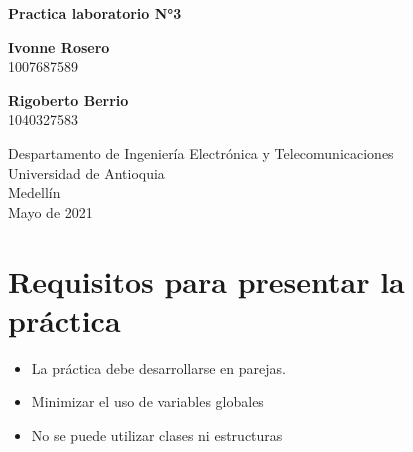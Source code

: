 \documentclass{article}
\begin{document}
\begin{titlepage}
    \begin{center}
        \vspace*{1cm}
        \Huge
        \textbf{Practica laboratorio N°3}
            
        \vspace{2 cm}
      
            
        \vspace{1.5cm}
            
        \textbf{Ivonne  Rosero }\\
        \large
        1007687589
        
        \vspace{2cm}
        \LARGE
        
        \textbf{Rigoberto Berrio}\\
        \large
        1040327583
            
        \vfill
             
        \vspace{0.8cm}
            
        \Large
        Despartamento de Ingeniería Electrónica y Telecomunicaciones\\
        Universidad de Antioquia\\
        Medellín\\
        Mayo de 2021
            
    \end{center}
\end{titlepage}
\tableofcontents
\newpage
\section{Requisitos para presentar la práctica}\label{intro}
\begin{itemize}
\item La práctica debe desarrollarse en parejas. \\
\end{itemize}

\begin{itemize}
\item Minimizar el uso de variables globales \\
\end{itemize}

\begin{itemize}
\item No se puede utilizar clases ni estructuras \\
\end{itemize}
\end{document}
